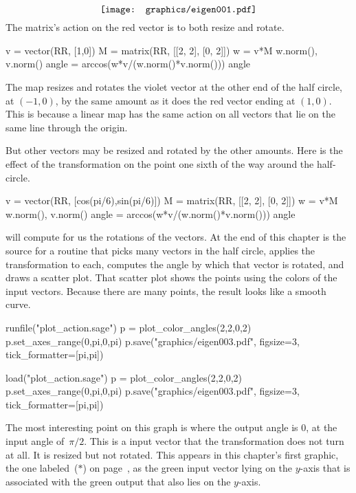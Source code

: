 \begin{equation*}
  \vcenteredhbox{\texttt{[image: graphics/eigen001.pdf]}}
\end{equation*}
The matrix's action on the red vector is to both resize and rotate.
\begin{sageoutput}
v = vector(RR, [1,0])
M = matrix(RR, [[2, 2], [0, 2]])
w = v*M
w.norm(), v.norm() 
angle = arccos(w*v/(w.norm()*v.norm())) 
angle 
\end{sageoutput}
\noindent The map resizes and rotates the violet vector at the other end of the 
half circle, at $(-1,0)$, by the
same amount as it does the red vector ending at $(1,0)$. 
This is because a linear map has the same action on 
all vectors that lie on the same line through the origin.

But other vectors may be resized and rotated by the other
amounts.
Here is the effect of the transformation on the point
one sixth of the way around the half-circle.
\begin{sageoutput}
v = vector(RR, [cos(pi/6),sin(pi/6)])
M = matrix(RR, [[2, 2], [0, 2]])
w = v*M
w.norm(), v.norm() 
angle = arccos(w*v/(w.norm()*v.norm())) 
angle 
\end{sageoutput}

\Sage{} will compute for us the rotations of the vectors.
At the end of this chapter is the source for a routine 
 that
picks many vectors in the 
half circle, applies the transformation to each, 
computes the angle by which that
vector is rotated, and draws a scatter plot. 
That scatter plot shows the points using
the colors of the input vectors.
Because there are many points, the result looks like a smooth curve.
\begin{sageoutput}[d,0,1]
runfile("plot_action.sage")  
p = plot_color_angles(2,2,0,2)
p.set_axes_range(0,pi,0,pi)
p.save("graphics/eigen003.pdf", figsize=3, tick_formatter=[pi,pi])
\end{sageoutput}
\begin{sagesilent}
load("plot_action.sage")  
p = plot_color_angles(2,2,0,2)
p.set_axes_range(0,pi,0,pi)
p.save("graphics/eigen003.pdf", figsize=3, tick_formatter=[pi,pi])
\end{sagesilent}
\begin{center}
\end{center}
The most interesting point on this graph is where the output angle is $0$,
at the input angle of~$\pi/2$.
This is a input vector that the transformation does not turn at all. 
It is resized but not rotated.
This appears in this chapter's first graphic, the one labeled~($*$)
on page~\pageref{gr:firstgraphic}, 
as the green input vector lying on the $y$-axis
that is associated with the green output that also lies on the $y$-axis.




